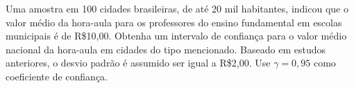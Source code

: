 %
%


\begin{exercicioBanco}[\valorquestao]
    Uma amostra em 100 cidades brasileiras, de até 20 mil habitantes, indicou que o valor médio da hora-aula para os professores do ensino fundamental em escolas municipais é de R\$10,00. Obtenha um intervalo de confiança para o valor médio nacional da hora-aula em cidades do tipo mencionado. Baseado em estudos anteriores, o desvio padrão é assumido ser igual a R\$2,00. Use \(\gamma = 0,95\) como coeficiente de confiança.
\end{exercicioBanco}

